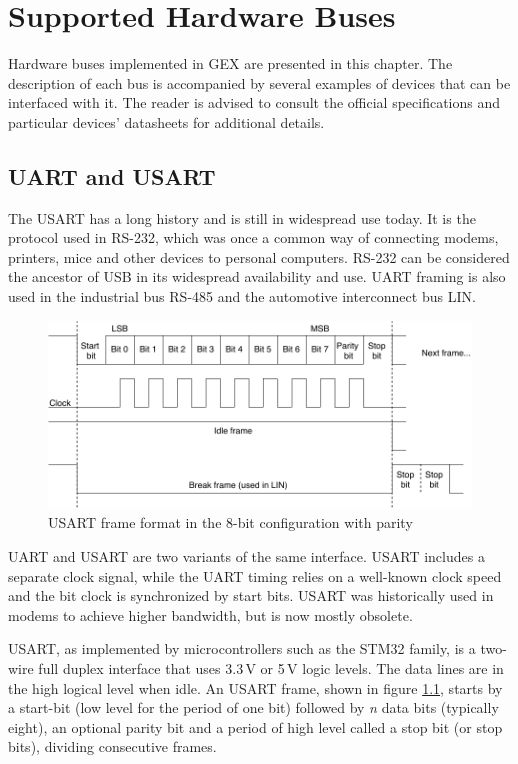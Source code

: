 \chapter{Supported Hardware Buses} \label{ch:hw_buses}

Hardware buses implemented in GEX are presented in this chapter. The description of each bus is accompanied by several examples of devices that can be interfaced with it. The reader is advised to consult the official specifications and particular devices' datasheets for additional details.

\section{UART and USART} \label{sec:theory-usart}

The \acrfull{USART} has a long history and is still in widespread use today. It is the protocol used in RS-232, which was once a common way of connecting modems, printers, mice and other devices to personal computers. RS-232 can be considered the ancestor of \gls{USB} in its widespread availability and use. \gls{UART} framing is also used in the industrial bus RS-485 and the automotive interconnect bus \gls{LIN}.

\begin{figure}[h]
	\centering
	\includegraphics[scale=.9] {img/uart-frame-redraw.pdf}
	\caption[UART frame format]{\label{fig:uart-frame}\gls{USART} frame format in the 8-bit configuration with parity}
\end{figure}

\gls{UART} and \gls{USART} are two variants of the same interface. \gls{USART} includes a separate clock signal, while the \gls{UART} timing relies on a well-known clock speed and the bit clock is synchronized by start bits. \gls{USART} was historically used in modems to achieve higher bandwidth, but is now mostly obsolete.

\gls{USART}, as implemented by microcontrollers such as the STM32 family, is a two-wire full duplex interface that uses 3.3\,V or 5\,V logic levels. The data lines are in the high logical level when idle. An \gls{USART} frame, shown in figure \ref{fig:uart-frame}, starts by a start-bit (low level for the period of one bit) followed by \textit{n} data bits (typically eight), an optional parity bit and a period of high level called a stop bit (or stop bits), dividing consecutive frames.


